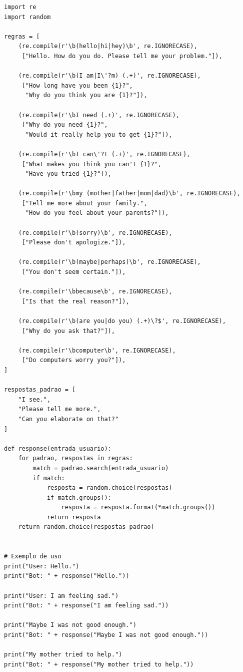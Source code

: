 \documentclass[14pt,a4paper,oneside]{book}
\begin{document}
\begin{verbatim}
import re  
import random  

regras = [
    (re.compile(r'\b(hello|hi|hey)\b', re.IGNORECASE),
     ["Hello. How do you do. Please tell me your problem."]),

    (re.compile(r'\b(I am|I\'?m) (.+)', re.IGNORECASE),
     ["How long have you been {1}?",   
      "Why do you think you are {1}?"]),

    (re.compile(r'\bI need (.+)', re.IGNORECASE),
     ["Why do you need {1}?",
      "Would it really help you to get {1}?"]),

    (re.compile(r'\bI can\'?t (.+)', re.IGNORECASE),
     ["What makes you think you can't {1}?",
      "Have you tried {1}?"]),

    (re.compile(r'\bmy (mother|father|mom|dad)\b', re.IGNORECASE),
     ["Tell me more about your family.",
      "How do you feel about your parents?"]),

    (re.compile(r'\b(sorry)\b', re.IGNORECASE),
     ["Please don't apologize."]),

    (re.compile(r'\b(maybe|perhaps)\b', re.IGNORECASE),
     ["You don't seem certain."]),

    (re.compile(r'\bbecause\b', re.IGNORECASE),
     ["Is that the real reason?"]),

    (re.compile(r'\b(are you|do you) (.+)\?$', re.IGNORECASE),
     ["Why do you ask that?"]),

    (re.compile(r'\bcomputer\b', re.IGNORECASE),
     ["Do computers worry you?"]),
]

respostas_padrao = [
    "I see.",  
    "Please tell me more.",  
    "Can you elaborate on that?"  
]

def response(entrada_usuario):
    for padrao, respostas in regras:
        match = padrao.search(entrada_usuario)  
        if match:
            resposta = random.choice(respostas)
            if match.groups():
                resposta = resposta.format(*match.groups())
            return resposta
    return random.choice(respostas_padrao)


# Exemplo de uso
print("User: Hello.")
print("Bot: " + response("Hello."))

print("User: I am feeling sad.")
print("Bot: " + response("I am feeling sad."))

print("Maybe I was not good enough.")
print("Bot: " + response("Maybe I was not good enough."))

print("My mother tried to help.")
print("Bot: " + response("My mother tried to help."))

\end{verbatim}
\end{document}
